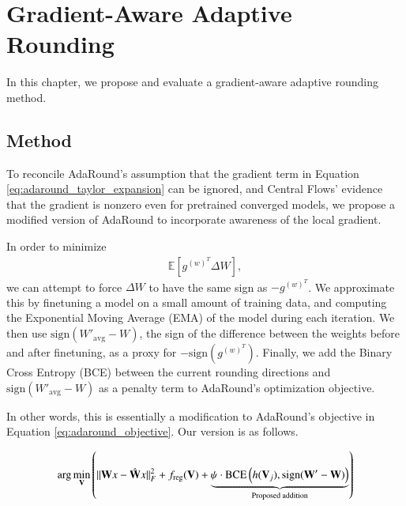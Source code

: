 \documentclass[../main.tex]{subfiles}
\begin{document}
\chapter{Gradient-Aware Adaptive Rounding} \label{chap:gradient_aware_adaround}
In this chapter, we propose and evaluate a gradient-aware adaptive rounding method.

\section{Method}
To reconcile AdaRound's assumption that the gradient term in Equation \ref{eq:adaround_taylor_expansion} can be ignored, and Central Flows' evidence that the gradient is nonzero even for pretrained converged models, we propose a modified version of AdaRound to incorporate awareness of the local gradient.

In order to minimize
\begin{align}
    \mathbb{E} \left[ g^{(w)^T} \Delta W \right],
\end{align}
we can attempt to force $\Delta W$ to have the same sign as $-g^{(w)^T}$. We approximate this by finetuning a model on a small amount of training data, and computing the Exponential Moving Average (EMA) of the model during each iteration. We then use $\text{sign}(W'_{\text{avg}} - W)$, the sign of the difference between the weights before and after finetuning, as a proxy for $-\text{sign}\left(g^{(w)^T}\right)$. Finally, we add the Binary Cross Entropy (BCE) between the current rounding directions and $\text{sign}(W'_{\text{avg}} - W)$ as a penalty term to AdaRound's optimization objective.

In other words, this is essentially a modification to AdaRound's objective in Equation \ref{eq:adaround_objective}. Our version is as follows.

\begin{align}
\arg\min_{\mathbf{V}} \left( \|\mathbf{W}x - \hat{\mathbf{W}}x\|_F^2 + f_\text{reg}(\mathbf{V}) + \underbrace{\psi \cdot \textsc{BCE}\left(h(\mathbf{V}_j), \text{sign}(\mathbf{W}' - \mathbf{W})\right)}_{\text{Proposed addition}} \right)
\end{align}
\end{document}
